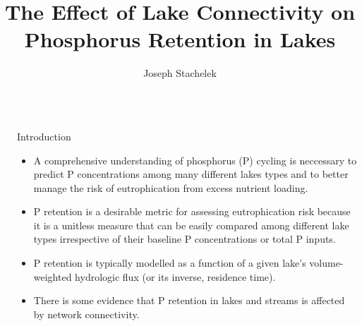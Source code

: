 \documentclass[final,hyperref={pdfpagelabels=false}]{beamer}
\title{\huge The Effect of Lake Connectivity on Phosphorus Retention in Lakes} %
\author{Joseph Stachelek} %
\institute{Department of Fisheries and Wildlife, Michigan State University, MI, USA} %
\begin{document}

\begin{frame}[t] %

\begin{columns}[t] %

\begin{column}{.02\textwidth}\end{column} %

\begin{column}{.465\textwidth} %

            
\begin{block}{Introduction}

\begin{itemize}
\item A comprehensive understanding of phosphorus (P) cycling is neccessary to predict P concentrations among many different lakes types and to better manage the risk of eutrophication from excess nutrient loading.
\vspace{1em}
\item P retention is a desirable metric for assessing eutrophication risk because it is a unitless measure that can be easily compared among different lake types irrespective of their baseline P concentrations or total P inputs.
\vspace{1em}
\item P retention is typically modelled as a function of a given lake's volume-weighted hydrologic flux (or its inverse, \alert{residence time}).
\vspace{0.5em}
\item There is some evidence that P retention in lakes and streams is affected by network connectivity. 
\end{itemize}
\end{block}


\end{column}
\end{columns}
\end{frame}
\end{document}
